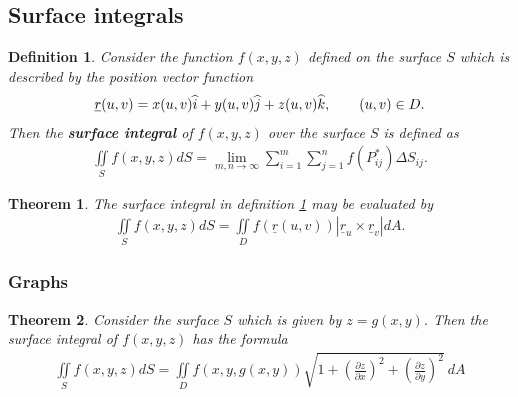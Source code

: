 \documentclass{article}
\theoremstyle{sltheorem}
\newtheorem{definition}{Definition}[section]
\newtheorem{theorem}{Theorem}[section]
\newcommand{\ih}{\widehat i}
\newcommand{\jh}{\widehat j}
\newcommand{\kh}{\widehat k}
\newcommand{\di}{\iint\limits}
\newcommand{\hs}{\hspace{0.7cm}}
\renewcommand{\vec}{\underline}
\newcommand*\B[1]{\textbf{#1}}
\begin{document}
\subsection{Surface integrals}
\begin{definition}
    \label{si_def}
    Consider the function $f(x,y,z)$ defined on the surface $S$ which is described by the
    position vector function
    \begin{align*}
        \vec r(u,v) = x(u,v)\ih + y(u,v)\jh + z(u,v)\kh,\hs (u,v)\in D.
    \end{align*}
    Then the \B{surface integral} of $f(x,y,z)$ over the surface $S$ is defined as
    \begin{align*}
        \di_S f(x,y,z)dS = \lim_{m,n\to\infty}\sum_{i=1}^m\sum_{j=1}^n f(P_{ij}^*)\Delta S_{ij}.
    \end{align*}
\end{definition}
\begin{theorem}
    The surface integral in definition \ref{si_def} may be evaluated by
    \begin{align*}
        \di_S f(x,y,z)dS = \di_D f(\vec r(u,v)) |\vec r_u\times \vec r_v|dA.
    \end{align*}
\end{theorem}
\subsubsection{Graphs}
\begin{theorem}
    Consider the surface $S$ which is given by $z=g(x,y)$. Then the surface integral 
    of $f(x,y,z)$ has the formula
    \begin{align*}
        \di_S f(x,y,z)dS = \di_D f(x,y,g(x,y))\sqrt{1+\left(\frac{\partial z}{\partial x}\right)^2+\left(\frac{\partial z}{\partial y}\right)^2}\:dA
    \end{align*}
\end{theorem}
\end{document}
